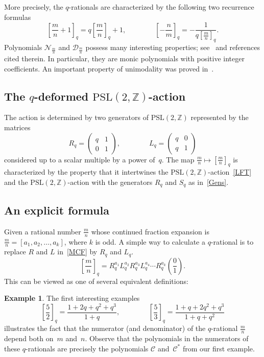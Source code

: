 \documentclass{article}[12pt]
\theoremstyle{plain}
\theoremstyle{definition}
\newtheorem{ex}[lem]{Example}
\newcommand{\Z}{\mathbb{Z}}
\newcommand{\cC}{\mathcal{C}}
\newcommand{\cD}{\mathcal{D}}
\newcommand{\cN}{\mathcal{N}}
\newcommand{\PSL}{\mathrm{PSL}}
\begin{document}
More precisely, the $q$-rationals are characterized by the following two recurrence formulas
\begin{equation}
\label{RecRat}
\left[\frac{m}{n}+1\right]_q=
q\left[\frac{m}{n}\right]_q+1,
\qquad\qquad
\left[-\frac{n}{m}\right]_q=
-\frac{1}{q\left[\frac{m}{n}\right]_q}.
\end{equation}
Polynomials $\cN_{\frac{m}{n}}$ and $\cD_{\frac{m}{n}}$  
possess many interesting properties; see~\cite{MGOmn} and references cited therein.
In particular, they are monic  polynomials with positive integer coefficients.
An important property of unimodality was proved in~\cite{OgRa}.

\subsection{The $q$-deformed $\PSL(2,\Z)$-action}

The action is determined by two generators of $\PSL(2,\Z)$ represented by the matrices
\begin{equation}
\label{Gens}
R_{q}=
\begin{pmatrix}
q&1\\
0&1
\end{pmatrix},
\qquad\qquad
L_{q}=
\begin{pmatrix}
q&0\\
q&1
\end{pmatrix}
\end{equation}
considered up to a scalar multiple by a power of~$q$.
The map $\frac{m}{n}\mapsto\left[\frac{m}{n}\right]_q$ is characterized by the property
that it intertwines the $\PSL(2,\Z)$-action~\eqref{LFT} and the $\PSL(2,\Z)$-action
with the generators $R_q$ and $S_q$ as in~\eqref{Gens}.


\subsection{An explicit formula}

Given a rational number $\frac{m}{n}$ whose continued fraction expansion is
$\frac{m}{n}=[a_1,a_2,\ldots,a_k]$, where $k$ is odd.
A simple way to calculate a $q$-rational is to replace $R$ and $L$ in~\eqref{MCF} by
$R_q$ and $L_q$.
$$
\left[\frac{m}{n}\right]_q
=
R_q^{a_1}L_q^{a_2}R_q^{a_3}L_q^{a_4}\cdots{}R_q^{a_k}
\left(\frac{0}{1}\right).
$$
This can be viewed as one of several equivalent definitions:

\begin{ex}
The first interesting examples
$$
\left[\frac{5}{2}\right]_{q}=
\frac{1+2q+q^{2}+q^{3}}{1+q},
\qquad\qquad
\left[\frac{5}{3}\right]_{q}=
\frac{1+q+2q^{2}+q^{3}}{1+q+q^{2}}
$$
illustrates the fact that the numerator (and denominator) of the $q$-rational
$\frac{m}{n}$ depend both on~$m$ and~$n$.
Observe that the polynomials in  the numerators
of these $q$-rationals are precisely the polynomials $\cC$ and~$\cC^*$ 
from our first example.

\end{ex}
\end{document}
